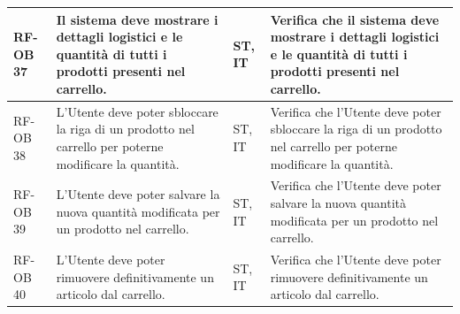 \documentclass[a4paper,11pt,oneside]{scrartcl}
\begin{document}
\begin{longtable}{|p{1.5cm}|p{4.5cm}|p{1.8cm}|p{6cm}|}
    RF-OB 37         & Il sistema deve mostrare i dettagli logistici e le quantità di tutti i prodotti presenti nel carrello.                                                                                                                                                                                                & ST, IT             & Verifica che il sistema deve mostrare i dettagli logistici e le quantità di tutti i prodotti presenti nel carrello.                                                                                                                                                                                                \\ \hline
    RF-OB 38         & L'Utente deve poter sbloccare la riga di un prodotto nel carrello per poterne modificare la quantità.                                                                                                                                                                                                 & ST, IT             & Verifica che l'Utente deve poter sbloccare la riga di un prodotto nel carrello per poterne modificare la quantità.                                                                                                                                                                                                 \\ \hline
    RF-OB 39         & L'Utente deve poter salvare la nuova quantità modificata per un prodotto nel carrello.                                                                                                                                                                                                                & ST, IT             & Verifica che l'Utente deve poter salvare la nuova quantità modificata per un prodotto nel carrello.                                                                                                                                                                                                                \\ \hline
    RF-OB 40         & L'Utente deve poter rimuovere definitivamente un articolo dal carrello.                                                                                                                                                                                                                               & ST, IT             & Verifica che l'Utente deve poter rimuovere definitivamente un articolo dal carrello.                                                                                                                                                                                                                               \\ \hline

\end{longtable}
\end{document}
